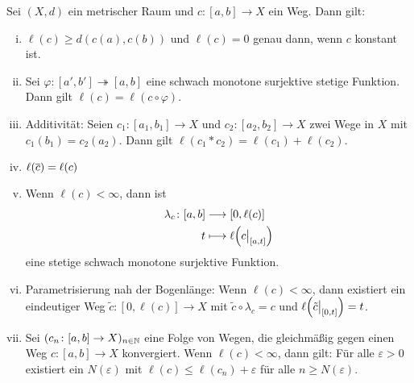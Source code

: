 \begin{proposition}
\label{prop:2.6}
	Sei $(X,d)$ ein metrischer Raum und $c\colon [a,b] \rightarrow X$ ein Weg.
	Dann gilt:
	\begin{enumerate}[(i)]
		\item $\ell(c) \geq d(c(a),c(b))$ und $\ell(c) = 0$ genau dann, wenn $c$ konstant ist.
		\item Sei $\varphi\colon [a',b'] \twoheadrightarrow [a,b]$ eine schwach monotone surjektive stetige Funktion.
		Dann gilt $\ell(c) = \ell(c\circ \varphi)$.
		\item Additivität: Seien $c_1 \colon [a_1,b_1] \rightarrow X$ und $c_2 \colon [a_2,b_2] \rightarrow X$ zwei Wege in $X$ mit $c_1(b_1) = c_2(a_2)$.
		Dann gilt $\ell(c_1 * c_2) = \ell(c_1) + \ell(c_2)$.
		\item $\ell(\overline{c}) = \ell(c)$
		\item Wenn $\ell(c) < \infty$, dann ist
		\begin{align*}
			\lambda_c \colon [a,b] &\longrightarrow [0,\ell(c)] \\
			t &\longmapsto \ell\enbrace*{c \big|_{[a,t]}}
		\end{align*}
		eine stetige schwach monotone surjektive Funktion.
		\item Parametrisierung nah der Bogenlänge: Wenn $\ell(c) < \infty$, dann existiert ein eindeutiger Weg $\tilde{c} \colon [0,\ell(c)] \rightarrow X$ mit $\tilde{c} \circ \lambda_c = c$ und $\ell\enbrace*{\tilde{c} \big|_{[0,t]}} = t$.
		\item Sei $(c_n \colon [a,b] \rightarrow X)_{n \in \mathbb{N}}$ eine Folge von Wegen, die gleichmäßig gegen einen Weg $c \colon [a,b] \rightarrow X$ konvergiert.
		Wenn $\ell(c) < \infty$, dann gilt:
		Für alle $\varepsilon > 0$ existiert ein $N(\varepsilon)$ mit $\ell(c) \leq \ell(c_n) + \varepsilon$ für alle $n \geq N(\varepsilon)$.
	\end{enumerate}
\end{proposition}

